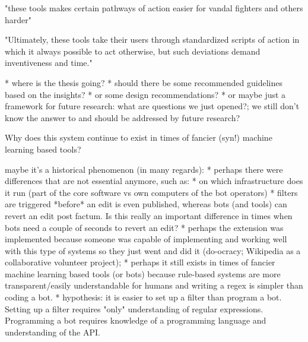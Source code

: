 "these tools makes certain pathways of action easier for vandal
fighters and others harder"

"Ultimately, these tools take their users
through standardized scripts of action in which it always
possible to act otherwise, but such deviations demand
inventiveness and time."

* where is the thesis going?
  * should there be some recommended guidelines based on the insights?
  * or some design recommendations?
  * or maybe just a framework for future research: what are questions we just opened?; we still don't know the answer to and should be addressed by future research?

Why does this system continue to exist in times of fancier (syn!) machine learning based tools?

maybe it's a historical phenomenon (in many regards):
* perhaps there were differences that are not essential anymore, such as:
  * on which infrastructure does it run (part of the core software vs own computers of the bot operators)
  * filters are triggered *before* an edit is even published, whereas bots (and tools) can revert an edit post factum. Is this really an important difference in times when bots need a couple of seconds to revert an edit?
* perhaps the extension was implemented because someone was capable of implementing and working well with this type of systems so they just went and did it (do-ocracy; Wikipedia as a collaborative volunteer project);
* perhaps it still exists in times of fancier machine learning based tools (or bots) because rule-based systems are more transparent/easily understandable for humans and writing a regex is simpler than coding a bot.
* hypothesis: it is easier to set up a filter than program a bot. Setting up a filter requires "only" understanding of regular expressions. Programming a bot requires knowledge of a programming language and understanding of the API.

